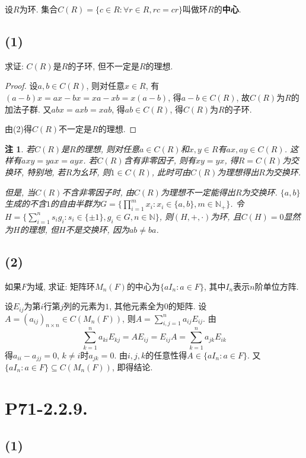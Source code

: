 \documentclass[12pt, a4paper, fontset=windows]{ctexart}
\newcommand{\N}{\mathbb{N}}
\newtheorem*{remark}{注}
\begin{document}
设$R$为环. 集合$C(R)=\{c\in R:\forall r\in R,rc=cr\}$叫做环$R$的{\bf 中心}. 

\subsection*{(1)}

求证: $C(R)$是$R$的子环, 但不一定是$R$的理想. 

\begin{proof}
设$a,b\in C(R)$, 则对任意$x\in R$, 有$(a-b)x=ax-bx=xa-xb=x(a-b)$, 得$a-b\in C(R)$, 
故$C(R)$为$R$的加法子群. 又$abx=axb=xab$, 得$ab\in C(R)$, 得$C(R)$为$R$的子环. 

由(2)得$C(R)$不一定是$R$的理想. 
\end{proof}

\begin{remark}
若$C(R)$是$R$的理想, 则对任意$a\in C(R)$和$x,y\in R$有$ax,ay\in C(R)$. 
这样有$axy=yax=ayx$. 若$C(R)$含有非零因子, 则有$xy=yx$, 得$R=C(R)$为交换环, 
特别地, 若$R$为幺环, 则$1\in C(R)$, 此时可由$C(R)$为理想得出$R$为交换环. 

但是, 当$C(R)$不含非零因子时, 由$C(R)$为理想不一定能得出$R$为交换环. 
$\{a,b\}$生成的不含$1$的自由半群为$G=\{\prod^m_{i=1}x_i:x_i\in\{a,b\},m\in\N_+\}$. 
令$H=\{\sum^n_{i=1}s_ig_i:s_i\in\{\pm 1\},g_i\in G,n\in\N\}$, 则$(H,+,\cdot)$为环, 
且$C(H)=0$显然为$H$的理想, 但$H$不是交换环, 因为$ab\ne ba$. 

\end{remark}

\subsection*{(2)}

如果$F$为域, 求证: 矩阵环$M_n(F)$的中心为$\{aI_n:a\in F\}$, 其中$I_n$表示$n$阶单位方阵. 

设$E_{ij}$为第$i$行第$j$列的元素为$1$, 其他元素全为$0$的矩阵. 
设$A=(a_{ij})_{n\times n}\in C(M_n(F))$, 则$A=\sum^n_{i,j=1}a_{ij}E_{ij}$. 
由\[\sum^n_{k=1}a_{ki}E_{kj}=AE_{ij}=E_{ij}A=\sum^n_{k=1}a_{jk}E_{ik}\]
得$a_{ii}-a_{jj}=0$, $k\ne i$时$a_{jk}=0$. 由$i,j,k$的任意性得$A\in\{aI_n:a\in F\}$. 
又$\{aI_n:a\in F\}\subseteq C(M_n(F))$, 即得结论. 

\section*{P71-2.2.9.}

\subsection*{(1)}
\end{document}
